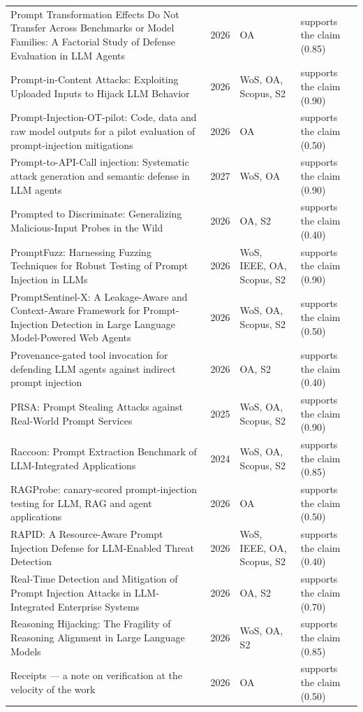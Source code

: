 \begin{longtable}{@{}%
  >{\raggedright\arraybackslash}p{}c%
  >{\raggedright\arraybackslash}p{}%
  >{\raggedright\arraybackslash}p{}@{}}
Prompt Transformation Effects Do Not Transfer Across Benchmarks or Model Families: A Factorial Study of Defense Evaluation in LLM Agents & 2026 & OA & supports the claim (0.85) \\
Prompt-in-Content Attacks: Exploiting Uploaded Inputs to Hijack LLM Behavior & 2026 & WoS, OA, Scopus, S2 & supports the claim (0.90) \\
Prompt-Injection-OT-pilot: Code, data and raw model outputs for a pilot evaluation of prompt-injection mitigations & 2026 & OA & supports the claim (0.50) \\
Prompt-to-API-Call injection: Systematic attack generation and semantic defense in LLM agents & 2027 & WoS, OA & supports the claim (0.90) \\
Prompted to Discriminate: Generalizing Malicious-Input Probes in the Wild & 2026 & OA, S2 & supports the claim (0.40) \\
PromptFuzz: Harnessing Fuzzing Techniques for Robust Testing of Prompt Injection in LLMs & 2026 & WoS, IEEE, OA, Scopus, S2 & supports the claim (0.90) \\
PromptSentinel-X: A Leakage-Aware and Context-Aware Framework for Prompt-Injection Detection in Large Language Model-Powered Web Agents & 2026 & WoS, OA, Scopus, S2 & supports the claim (0.50) \\
Provenance-gated tool invocation for defending LLM agents against indirect prompt injection & 2026 & OA, S2 & supports the claim (0.40) \\
PRSA: Prompt Stealing Attacks against Real-World Prompt Services & 2025 & WoS, OA, Scopus, S2 & supports the claim (0.90) \\
Raccoon: Prompt Extraction Benchmark of LLM-Integrated Applications & 2024 & WoS, OA, Scopus, S2 & supports the claim (0.85) \\
RAGProbe: canary-scored prompt-injection testing for LLM, RAG and agent applications & 2026 & OA & supports the claim (0.50) \\
RAPID: A Resource-Aware Prompt Injection Defense for LLM-Enabled Threat Detection & 2026 & WoS, IEEE, OA, Scopus, S2 & supports the claim (0.40) \\
Real-Time Detection and Mitigation of Prompt Injection Attacks in LLM-Integrated Enterprise Systems & 2026 & OA, S2 & supports the claim (0.70) \\
Reasoning Hijacking: The Fragility of Reasoning Alignment in Large Language Models & 2026 & WoS, OA, S2 & supports the claim (0.85) \\
Receipts --- a note on verification at the velocity of the work & 2026 & OA & supports the claim (0.50) \\

\end{longtable}
